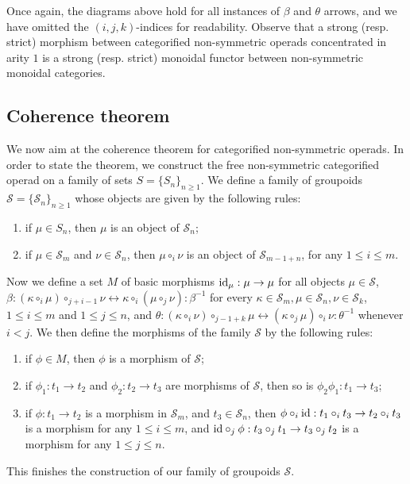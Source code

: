 Once again, the diagrams above hold for all instances of $\beta$ and $\theta$ arrows, and we have omitted the $(i,j,k)$-indices for readability. 
Observe that a strong (resp. strict) morphism between categorified non-symmetric operads concentrated in arity $1$ is a strong (resp. strict) monoidal functor between non-symmetric monoidal categories. 

\subsection{Coherence theorem}

We now aim at the coherence theorem for categorified non-symmetric operads.
In order to state the theorem, we construct the free non-symmetric categorified operad on a family of sets $S=\{S_n\}_{n \geq 1}$.
We define a family of groupoids $\mathcal{S}=\{\mathcal{S}_n\}_{n \geq 1}$ whose objects are given by the following rules:
\begin{enumerate}
    \item if $\mu \in S_n$, then $\mu$ is an object of $\mathcal{S}_n$;
    \item if $\mu \in \mathcal{S}_m$ and $\nu \in \mathcal{S}_n$, then $\mu \circ_i \nu$ is an object of $\mathcal{S}_{m-1+n}$, for any $1 \leq i \leq m$.
\end{enumerate}
Now we define a set $M$ of basic morphisms $\mathrm{id}_\mu : \mu \to \mu$ for all objects $\mu\in \mathcal{S}$, $\beta: (\kappa \circ_i \mu) \circ_{j+i-1} \nu \leftrightarrow \kappa \circ_i (\mu \circ_j \nu) : \beta^{-1}$ for every $\kappa \in \mathcal{S}_m, \mu \in \mathcal{S}_n, \nu \in \mathcal{S}_k$, $1 \leq i \leq m$ and $1 \leq j \leq n$, and $\theta: (\kappa \circ_i \nu) \circ_{j-1+k} \mu \leftrightarrow (\kappa \circ_j \mu) \circ_i \nu : \theta^{-1}$ whenever $i<j$.
We then define the morphisms of the family $\mathcal{S}$ by the following rules:
\begin{enumerate}
    \item if $\phi \in M$, then $\phi$ is a morphism of $\mathcal{S}$; 
    \item if $\phi_1: t_1 \to t_2$ and $\phi_2: t_2 \to t_3$ are morphisms of $\mathcal{S}$, then so is $\phi_2 \phi_1 : t_1 \to t_3$;
    \item if $\phi : t_1 \to t_2$ is a morphism in $\mathcal{S}_m$, and $t_3 \in \mathcal{S}_n$, then $\phi \circ_i \mathrm{id} : t_1 \circ_i t_3 \to t_2 \circ_i t_3$ is a morphism for any $1 \leq i \leq m$, and $\mathrm{id} \circ_j \phi : t_3 \circ_j t_1 \to t_3 \circ_j t_2$ is a morphism for any $1 \leq j \leq n$. 
\end{enumerate}
This finishes the construction of our family of groupoids $\mathcal{S}$.

